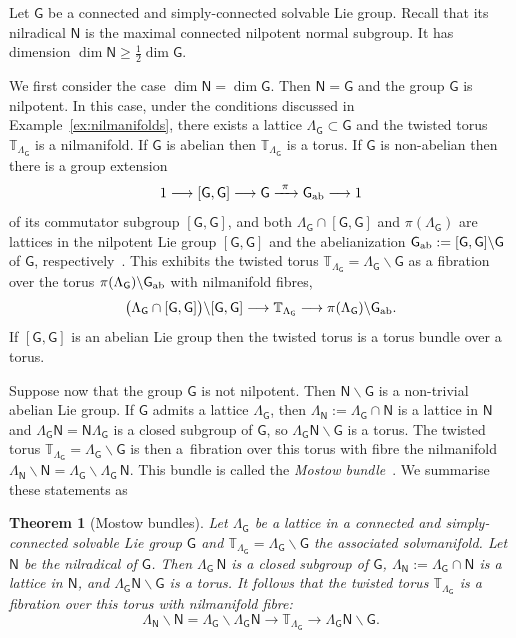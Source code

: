 \documentclass[10pt,a4paper]{amsart}
\numberwithin{equation}{section}
\newcommand{\sfG}{\mathsf{G}}
\newcommand{\sfN}{\mathsf{N}}
\newcommand{\torus}{{\mathbb T}} %
\newtheorem{Theorem}{Theorem}[section]
\begin{document}
Let $\sfG$ be
a connected and simply-connected solvable Lie group. Recall that its
nilradical $\sfN$ is the maximal connected nilpotent normal subgroup. It
has dimension $\dim\sfN\geq\frac12\dim\sfG$.

We first consider the case $\dim\sfN=\dim\sfG$. Then
$\sfN=\sfG$ and the group $\sfG$ is nilpotent. In this case, under the
conditions discussed in
Example~\ref{ex:nilmanifolds}, there exists a lattice
$\Lambda_\sfG\subset\sfG$ and the twisted torus $\torus_{\Lambda_\sfG}$ is a
nilmanifold. If $\sfG$ is abelian then $\torus_{\Lambda_\sfG}$ is a
torus. If $\sfG$ is non-abelian then there is a group extension
\[
1\longrightarrow [\sfG,\sfG]\longrightarrow\sfG\xrightarrow{ \ \pi \
}\sfG_{\rm ab}\longrightarrow 1
\]
of its commutator subgroup $[\sfG,\sfG]$,
and both $\Lambda_\sfG\cap[\sfG,\sfG]$ and $\pi(\Lambda_\sfG)$ are
lattices in the nilpotent Lie group $[\sfG,\sfG]$ and the
abelianization $\sfG_{\rm ab}:=[\sfG,\sfG]\backslash\sfG$ of $\sfG$, respectively~\cite{Corwin1990}. This exhibits
the twisted torus $\torus_{\Lambda_\sfG}=\Lambda_\sfG\backslash \sfG $ as a fibration over the torus
$\pi(\Lambda_\sfG)\backslash\sfG_{\rm ab}$ with
nilmanifold fibres,{\samepage
\[
\big(\Lambda_\sfG\cap[\sfG,\sfG]\big)\backslash[\sfG,\sfG] \longrightarrow \torus_{\Lambda_\sfG} \longrightarrow
\pi(\Lambda_\sfG)\backslash \sfG_{\rm ab} .
\]
If $[\sfG,\sfG]$ is an abelian Lie group then the twisted
torus is a torus bundle over a torus.}

Suppose now that the group $\sfG$ is not nilpotent. Then $\sfN\backslash\sfG$
is a non-trivial abelian Lie group. If $\sfG$ admits a lattice $\Lambda_\sfG$, then
$\Lambda_{\sfN}:=\Lambda_\sfG\cap\sfN$ is a lattice in $\sfN$ and
$\Lambda_\sfG \sfN=\sfN \Lambda_\sfG$ is a closed subgroup of $\sfG$, so
$\Lambda_\sfG \sfN\backslash\sfG$ is a torus. The twisted torus
$\torus_{\Lambda_\sfG}=\Lambda_\sfG\backslash\sfG$ is then a~fibration over this torus with fibre
the nilmanifold $\Lambda_{\sfN}\backslash\sfN=\Lambda_\sfG\backslash \Lambda_\sfG\,\sfN$. This
bundle is called the \emph{Mostow bundle}~\cite{Mostow1954}. We summarise these statements as
\begin{Theorem}[Mostow bundles]
\label{thm:Mostowbundle}
Let ${\Lambda_\sfG}$ be a lattice in a connected and simply-connected
solvable Lie group $\sfG$ and $\torus_{\Lambda_\sfG} =
\Lambda_\sfG\backslash\sfG$ the associated solvmanifold. Let $\sfN$ be the nilradical
 of $\sfG$.
Then $\Lambda_\sfG\,\sfN$ is a closed subgroup of $\sfG$,
$\Lambda_{\sfN}:=\Lambda_\sfG\cap\sfN$ is a lattice in
$\sfN$, and $\Lambda_\sfG \sfN\backslash\sfG$ is a torus.
It follows that the twisted torus
$\torus_{\Lambda_\sfG}$ is a fibration over this torus with
nilmanifold fibre:
\[
\Lambda_{\sfN}\backslash\sfN=\Lambda_\sfG\backslash\Lambda_\sfG \sfN
\longrightarrow
\torus_{\Lambda_\sfG}\longrightarrow \Lambda_\sfG \sfN\backslash\sfG .
\]
\end{Theorem}
\end{document}
